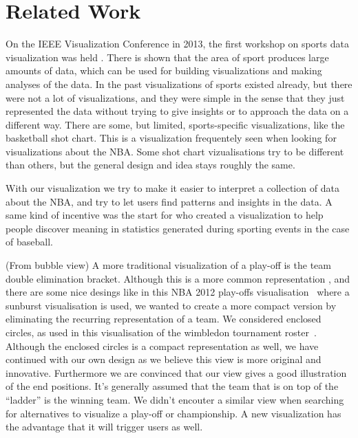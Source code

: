 \documentclass[chi_draft]{sigchi}
\begin{document}
\section{Related Work}\label{sec:literature}

On the IEEE Visualization Conference in 2013, the first workshop on sports data
visualization was held \cite{ieeevis}. There is shown that the area of sport
produces large amounts of data, which can be used for building visualizations
and making analyses of the data. In the past visualizations of sports existed
already, but there were not a lot of visualizations, and they were simple in
the sense that they just represented the data without trying to give insights
or to approach the data on a different way. There are some, but limited,
sports-specific visualizations, like the basketball shot chart. This is a
visualization frequentely seen when looking for visualizations about the NBA.
Some shot chart vizualisations try to be different than others, but the general
design and idea stays roughly the same. 

With our visualization we try to make it easier to interpret a collection of
data about the NBA, and try to let users find patterns and insights in the
data. A same kind of incentive was the start for \cite{cox2006sportsvis} who
created a visualization to help people discover meaning in statistics generated
during sporting events in the case of baseball.


(From bubble view)
A more traditional visualization of a play-off is the team double elimination
bracket.  Although this is a more common representation , and there are some
nice desings like in this NBA 2012 play-offs
visualisation~\cite{tournamentladder} where a sunburst visualisation is used,
we wanted to create a more compact version by eliminating the recurring
representation of a team. We considered enclosed circles, as used in this
visualisation of the wimbledon tournament roster~\cite{enclosedcircles}.
Although the enclosed circles is a compact representation as well, we have
continued with our own design as we believe this view is more original and
innovative. Furthermore we are convinced that our view gives a good
illustration of the end positions. It's generally assumed that the team that is
on top of the ``ladder'' is the winning team. We didn't encouter a similar view
when searching for alternatives to visualize a play-off or championship. A new
visualization has the advantage that it will trigger users as well.
\end{document}
